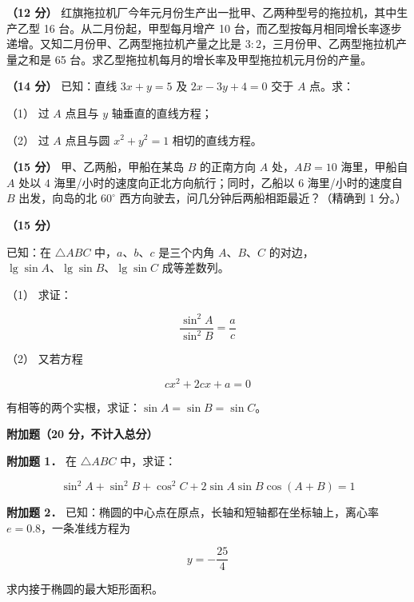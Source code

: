 \begin{question}
\textbf{（12 分）} 红旗拖拉机厂今年元月份生产出一批甲、乙两种型号的拖拉机，其中生产乙型 16 台。从二月份起，甲型每月增产 10 台，而乙型按每月相同增长率逐步递增。又知二月份甲、乙两型拖拉机产量之比是 $3:2$，三月份甲、乙两型拖拉机产量之和是 65 台。求乙型拖拉机每月的增长率及甲型拖拉机元月份的产量。

\end{question}
\begin{question}
\textbf{（14 分）} 已知：直线 $3x+y=5$ 及 $2x-3y+4=0$ 交于 $A$ 点。求：

（1） 过 $A$ 点且与 $y$ 轴垂直的直线方程；

（2） 过 $A$ 点且与圆 $x^2+y^2=1$ 相切的直线方程。

\Needspace{0.4\textheight}
\end{question}
\begin{question}
\textbf{（15 分）} 甲、乙两船，甲船在某岛 $B$ 的正南方向 $A$ 处，$AB=10$ 海里，甲船自 $A$ 处以 $4$ 海里/小时的速度向正北方向航行；同时，乙船以 $6$ 海里/小时的速度自 $B$ 出发，向岛的北 $60^\circ$ 西方向驶去，问几分钟后两船相距最近？（精确到 1 分。）
\nopagebreak[4]
\begin{center}\end{center}
\nopagebreak[4]
\end{question}
\begin{question}
\textbf{（15 分）} 

已知：在 $\triangle ABC$ 中，$a\text{、}b\text{、}c$ 是三个内角 $A\text{、}B\text{、}C$ 的对边，$\lg\sin A\text{、}\lg\sin B\text{、}\lg\sin C$ 成等差数列。

（1） 求证：

\nopagebreak[4]
\[
\frac{\sin^2A}{\sin^2B}=\frac ac
\]

（2） 又若方程

\nopagebreak[4]
\[
cx^2+2cx+a=0
\]

有相等的两个实根，求证：$\sin A=\sin B=\sin C$。

\begin{gktip}
\textbf{附加题（20 分，不计入总分）}
\end{gktip}

\textbf{附加题 1．} 在 $\triangle ABC$ 中，求证：

\nopagebreak[4]
\[
\sin^2A+\sin^2B+\cos^2C+2\sin A\sin B\cos(A+B)=1
\]

\textbf{附加题 2．} 已知：椭圆的中心点在原点，长轴和短轴都在坐标轴上，离心率 $e=0.8$，一条准线方程为

\nopagebreak[4]
\[
y=-\frac{25}{4}
\]

求内接于椭圆的最大矩形面积。

\end{question}